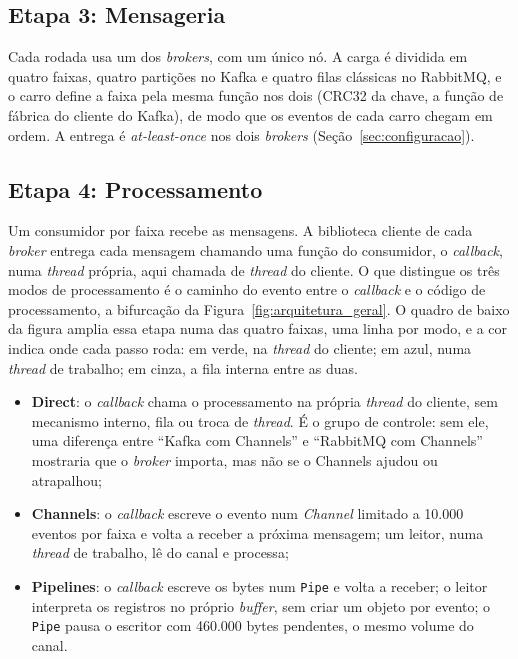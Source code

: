 \documentclass[12pt]{article}
\begin{document}
\subsection{Etapa 3: Mensageria}
\label{sec:mensageria}

Cada rodada usa um dos \textit{brokers}, com um único nó. A carga é dividida em quatro faixas,
quatro partições no Kafka e quatro filas clássicas no RabbitMQ, e o carro define a faixa
pela mesma função nos dois (CRC32 da chave, a função de fábrica do cliente do Kafka), de modo
que os eventos de cada carro chegam em ordem. A entrega é \textit{at-least-once} nos dois
\textit{brokers} (Seção~\ref{sec:configuracao}).

\subsection{Etapa 4: Processamento}
\label{sec:processamento}

Um consumidor por faixa recebe as mensagens. A biblioteca cliente de cada \textit{broker} entrega
cada mensagem chamando uma função do consumidor, o \textit{callback}, numa \textit{thread} própria,
aqui chamada de \textit{thread} do cliente. O que distingue os três modos de processamento é o
caminho do evento entre o \textit{callback} e o código de processamento, a bifurcação da
Figura~\ref{fig:arquitetura_geral}. O quadro de baixo da
figura amplia essa etapa numa das quatro faixas, uma linha por modo, e a cor indica onde
cada passo roda: em verde, na \textit{thread} do cliente; em azul, numa \textit{thread} de trabalho; em
cinza, a fila interna entre as duas.

\begin{itemize}
  \item \textbf{Direct}: o \textit{callback} chama o processamento na própria \textit{thread} do
        cliente, sem mecanismo interno, fila ou troca de \textit{thread}. É o grupo de controle: sem ele, uma
        diferença entre ``Kafka com Channels'' e ``RabbitMQ com Channels'' mostraria que
        o \textit{broker} importa, mas não se o Channels ajudou ou atrapalhou;
  \item \textbf{Channels}: o \textit{callback} escreve o evento num \textit{Channel} limitado a
        10.000 eventos por faixa e volta a receber a próxima mensagem; um leitor, numa
        \textit{thread} de trabalho, lê do canal e processa;
  \item \textbf{Pipelines}: o \textit{callback} escreve os bytes num \texttt{Pipe} e volta a
        receber; o leitor interpreta os registros no próprio \textit{buffer}, sem criar um objeto por evento; o
        \texttt{Pipe} pausa o escritor com 460.000 bytes pendentes, o mesmo volume do
        canal.
\end{itemize}
\end{document}
